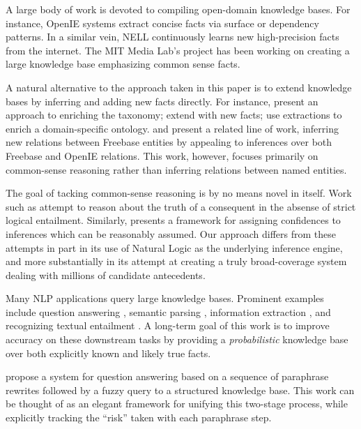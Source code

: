 A large body of work is devoted to compiling open-domain knowledge
  bases.
For instance, OpenIE systems
  \cite{key:2007yates-textrunner,key:2011fader-reverb,key:2012mausam-ollie}
  extract concise facts via surface or dependency patterns.
In a similar vein, NELL \cite{key:2010carlson-nell,key:2013gardnerpra-nell}
  continuously learns new high-precision facts from the internet.
The MIT Media Lab's  project
  \cite{key:2004liu-conceptnet}
  has been working on creating a large knowledge base emphasizing
  common sense facts.

A natural alternative to the approach taken in this paper is to
  extend knowledge bases by inferring and adding new facts directly.
For instance,
   present an approach to enriching 
    the  taxonomy;
   extend  with new facts;
   use  extractions to 
    enrich a domain-specific ontology.
 and 
  present a related line of work, inferring new relations between
  Freebase entities by appealing to inferences over both Freebase and
  OpenIE relations.
This work, however, focuses primarily on common-sense reasoning rather
  than inferring relations between named entities.

The goal of tacking common-sense reasoning is by no means novel in
  itself.
Work such as 
  attempt to reason about the truth of a consequent
  in the absense of strict logical entailment.
Similarly,  presents a framework for
  assigning confidences to inferences which can be reasonably assumed.
Our approach differs from these attempts in part in its use of Natural Logic
  as the underlying inference engine, and more substantially in its
  attempt at creating a truly broad-coverage system dealing with
  millions of candidate antecedents.

Many NLP applications query large knowledge bases.
Prominent examples include
  question answering
    \cite{key:2001voorhees-trec},
  semantic parsing
    \cite{key:1996zelle-semantics,key:2007zettlemoyer-semantics,key:2013kwiatkowski-semantics,key:2014berant-semantics},
  information extraction
    \cite{key:2011hoffman-kbp,key:2012surdeanu-mimlre},
  and recognizing textual entailment
    \cite{key:2010-schoenmackers-horn,key:2011berant-entailment}.
A long-term goal of this work is to improve accuracy on these
  downstream tasks by providing a \textit{probabilistic} knowledge base
  over both explicitly known and likely true facts.

 propose a system for question answering
  based on a sequence of paraphrase rewrites followed by a fuzzy query to
  a structured knowledge base.
This work can be thought of as an elegant framework for unifying this
  two-stage process, while explicitly tracking the ``risk'' taken with
  each paraphrase step.

  

